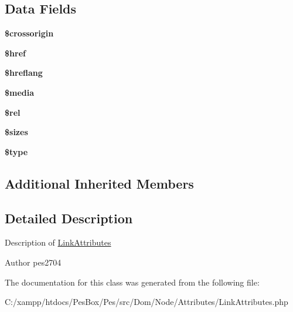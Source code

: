 \subsection*{Data Fields}
\begin{DoxyCompactItemize}
\item 
\mbox{\label{class_pes_1_1_dom_1_1_node_1_1_attributes_1_1_link_attributes_a3ed6e9d5d929ea55c008bb0957951f49}} 
{\bfseries \$crossorigin}
\item 
\mbox{\label{class_pes_1_1_dom_1_1_node_1_1_attributes_1_1_link_attributes_ae858fe52917aca7da3e5f64ac5bf665a}} 
{\bfseries \$href}
\item 
\mbox{\label{class_pes_1_1_dom_1_1_node_1_1_attributes_1_1_link_attributes_a3bf0ca23550da79dbf57058dedb86ca2}} 
{\bfseries \$hreflang}
\item 
\mbox{\label{class_pes_1_1_dom_1_1_node_1_1_attributes_1_1_link_attributes_a78eb168f8ffe2a51bff5f761a158c7cf}} 
{\bfseries \$media}
\item 
\mbox{\label{class_pes_1_1_dom_1_1_node_1_1_attributes_1_1_link_attributes_a2fadb944bb1aa1d60bdb72281e08ea3c}} 
{\bfseries \$rel}
\item 
\mbox{\label{class_pes_1_1_dom_1_1_node_1_1_attributes_1_1_link_attributes_a88f8893f563414e13269ca3219d6ebbc}} 
{\bfseries \$sizes}
\item 
\mbox{\label{class_pes_1_1_dom_1_1_node_1_1_attributes_1_1_link_attributes_a9a4a6fba2208984cabb3afacadf33919}} 
{\bfseries \$type}
\end{DoxyCompactItemize}
\subsection*{Additional Inherited Members}


\subsection{Detailed Description}
Description of \mbox{\hyperlink{class_pes_1_1_dom_1_1_node_1_1_attributes_1_1_link_attributes}{Link\+Attributes}}

\begin{DoxyAuthor}{Author}
pes2704 
\end{DoxyAuthor}


The documentation for this class was generated from the following file\+:\begin{DoxyCompactItemize}
\item 
C\+:/xampp/htdocs/\+Pes\+Box/\+Pes/src/\+Dom/\+Node/\+Attributes/Link\+Attributes.\+php\end{DoxyCompactItemize}
